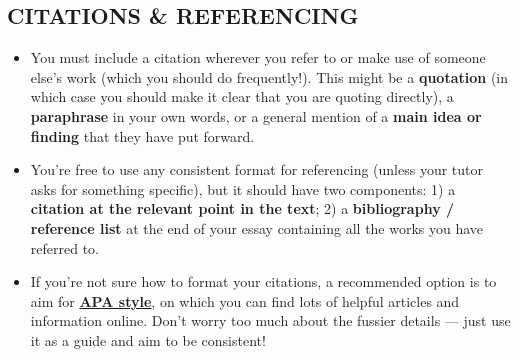 \documentclass[10pt,a4paper]{article}
\begin{document}
\begin{multicols}{2}
\section*{CITATIONS \& REFERENCING}
\begin{itemize}
\item You must include a citation wherever you refer to or make use of someone else’s work (which you should do frequently!). This might be a \textbf{quotation} (in which case you should make it clear that you are quoting directly), a
\textbf{paraphrase} in your own words, or a general mention of a \textbf{main idea or finding} that they have put forward.
\item You’re free to use any consistent format for referencing (unless your tutor asks for something specific), but it should have two components: 1) a \textbf{citation at the relevant point in the text}; 2) a \textbf{bibliography / reference list} at the end of your essay containing all the works you have referred to.

\item If you’re not sure how to format your citations, a recommended option is to aim for
\href{https://apastyle.apa.org/style-grammar-guidelines/references/examples}{\textbf{APA style}},
on which you can find lots of helpful articles and information online. Don’t worry too much about the fussier details --- just use it as a guide and aim to be consistent!
\end{itemize}
\vspace{0.05em}

{\centering
\hspace{10pt}
}



\end{multicols}
\end{document}
